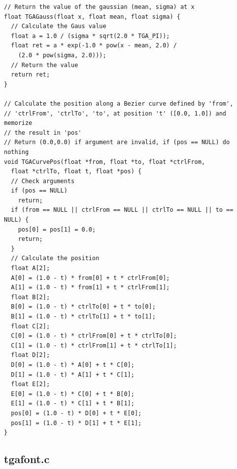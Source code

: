 \documentclass[12pt, a4paper]{article}
\begin{document}
\begin{scriptsize}
\begin{ttfamily}
\begin{lstlisting}
// Return the value of the gaussian (mean, sigma) at x
float TGAGauss(float x, float mean, float sigma) {
  // Calculate the Gaus value
  float a = 1.0 / (sigma * sqrt(2.0 * TGA_PI));
  float ret = a * exp(-1.0 * pow(x - mean, 2.0) / 
    (2.0 * pow(sigma, 2.0)));
  // Return the value
  return ret;
}

// Calculate the position along a Bezier curve defined by 'from',
// 'ctrlFrom', 'ctrlTo', 'to', at position 't' ([0.0, 1.0]) and memorize
// the result in 'pos'
// Return (0.0,0.0) if argument are invalid, if (pos == NULL) do nothing
void TGACurvePos(float *from, float *to, float *ctrlFrom, 
  float *ctrlTo, float t, float *pos) {
  // Check arguments
  if (pos == NULL)
    return;
  if (from == NULL || ctrlFrom == NULL || ctrlTo == NULL || to == NULL) {
    pos[0] = pos[1] = 0.0;
    return;
  }
  // Calculate the position
  float A[2];
  A[0] = (1.0 - t) * from[0] + t * ctrlFrom[0];
  A[1] = (1.0 - t) * from[1] + t * ctrlFrom[1];
  float B[2];
  B[0] = (1.0 - t) * ctrlTo[0] + t * to[0];
  B[1] = (1.0 - t) * ctrlTo[1] + t * to[1];
  float C[2];
  C[0] = (1.0 - t) * ctrlFrom[0] + t * ctrlTo[0];
  C[1] = (1.0 - t) * ctrlFrom[1] + t * ctrlTo[1];
  float D[2];
  D[0] = (1.0 - t) * A[0] + t * C[0];
  D[1] = (1.0 - t) * A[1] + t * C[1];
  float E[2];
  E[0] = (1.0 - t) * C[0] + t * B[0];
  E[1] = (1.0 - t) * C[1] + t * B[1];
  pos[0] = (1.0 - t) * D[0] + t * E[0];
  pos[1] = (1.0 - t) * D[1] + t * E[1];
}
\end{lstlisting}
\end{ttfamily}
\end{scriptsize}

\subsection{tgafont.c}
\end{document}
